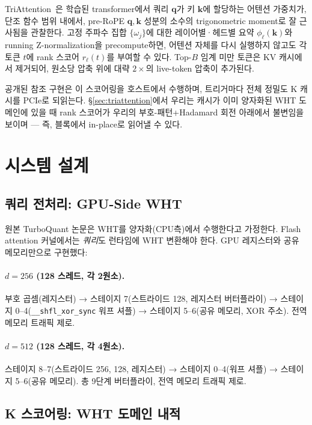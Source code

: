 \documentclass[10pt,twocolumn]{article}
\begin{document}
TriAttention~\cite{triattention2026}은 학습된 transformer에서 쿼리 $\mathbf{q}$가 키 $\mathbf{k}$에 할당하는 어텐션 가중치가, 단조 함수 범위 내에서, pre-RoPE $\mathbf{q}, \mathbf{k}$ 성분의 소수의 trigonometric moment로 잘 근사됨을 관찰한다. 고정 주파수 집합 $\{\omega_j\}$에 대한 레이어별·헤드별 요약 $\phi_\ell(\mathbf{k})$와 running Z-normalization을 precompute하면, 어텐션 자체를 다시 실행하지 않고도 각 토큰 $t$에 rank 스코어 $r_\ell(t)$를 부여할 수 있다. Top-$B$ 임계 미만 토큰은 KV 캐시에서 제거되어, 원소당 압축 위에 대략 $2\times$의 live-token 압축이 추가된다.

공개된 참조 구현은 이 스코어링을 호스트에서 수행하며, 트리거마다 전체 정밀도 K 캐시를 PCIe로 되읽는다. \S\ref{sec:triattention}에서 우리는 캐시가 이미 양자화된 WHT 도메인에 있을 때 rank 스코어가 우리의 부호-패턴+Hadamard 회전 아래에서 불변임을 보이며 --- 즉, 블록에서 in-place로 읽어낼 수 있다.

\section{시스템 설계}
\label{sec:design}

\subsection{쿼리 전처리: GPU-Side WHT}

원본 TurboQuant 논문은 WHT를 양자화(CPU측)에서 수행한다고 가정한다. Flash attention 커널에서는 \emph{쿼리}도 런타임에 WHT 변환해야 한다. GPU 레지스터와 공유 메모리만으로 구현했다:

\paragraph{$d=256$ (128 스레드, 각 2원소).}
부호 곱셈(레지스터) → 스테이지 7(스트라이드 128, 레지스터 버터플라이) → 스테이지 0--4(\texttt{\_\_shfl\_xor\_sync} 워프 셔플) → 스테이지 5--6(공유 메모리, XOR 주소). 전역 메모리 트래픽 제로.

\paragraph{$d=512$ (128 스레드, 각 4원소).}
스테이지 8--7(스트라이드 256, 128, 레지스터) → 스테이지 0--4(워프 셔플) → 스테이지 5--6(공유 메모리). 총 9단계 버터플라이, 전역 메모리 트래픽 제로.

\subsection{K 스코어링: WHT 도메인 내적}
\end{document}
